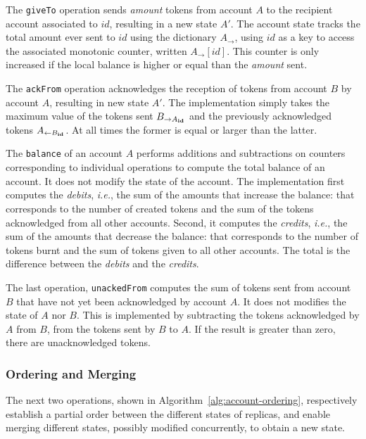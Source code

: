 \documentclass[9pt, oneside]{article}   	%
\begin{document}
The \texttt{giveTo} operation sends \textit{amount} tokens from account $A$ to the recipient account associated to $id$, resulting in a new state $A'$. The account state tracks the total amount ever sent to $id$ using the dictionary $A_{\rightarrow}$, using $id$ as a key to access the associated monotonic counter, written $A_{\rightarrow}[id]$. This counter is only increased if the local balance is higher or equal than the \textit{amount} sent.

The \texttt{ackFrom} operation acknowledges the reception of tokens from account $B$ by account $A$, resulting in new state $A'$. The implementation simply takes the maximum value of the tokens sent $B_{\rightarrow A_{\tiny \textbf{id}}}$ and the previously acknowledged tokens $A_{\leftarrow B_{\tiny \textbf{id}}}$. At all times the former is equal or larger than the latter.

The \texttt{balance} of an account $A$ performs additions and subtractions on counters corresponding to individual operations to compute the total balance of an account. It does not modify the state of the account. The implementation first computes the \textit{debits}, \textit{i.e.}, the sum of the amounts that increase the balance: that corresponds to the number of created tokens and the sum of the tokens acknowledged from all other accounts. Second, it computes the \textit{credits}, \textit{i.e.}, the sum of the amounts that decrease the balance: that corresponds to the number of tokens burnt and the sum of tokens given to all other accounts. The total is the difference between the \textit{debits} and the \textit{credits}.

The last operation, \texttt{unackedFrom} computes the sum of tokens sent from account $B$ that have not yet been acknowledged by account $A$. It does not modifies the state of $A$ nor $B$. This is implemented by subtracting the tokens acknowledged by $A$ from $B$, from the tokens sent by $B$ to $A$. If the result is greater than zero, there are unacknowledged tokens.

\subsubsection{Ordering and Merging}
\label{sec:account:ordering-merging}

The next two operations, shown in Algorithm~\ref{alg:account-ordering}, respectively establish a partial order between the different states of replicas, and enable merging different states, possibly modified concurrently, to obtain a new state.
\end{document}
